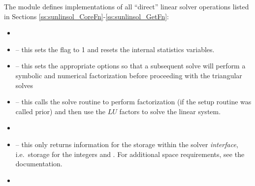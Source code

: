 The {\sunlinsolsludist} module defines implementations of all
``direct'' linear solver operations listed in Sections
\ref{ss:sunlinsol_CoreFn}-\ref{ss:sunlinsol_GetFn}:
\begin{itemize}
\item {}
\item {} -- this sets the
   flag to 1 and resets the internal {\superludist}
  statistics variables.
\item {} -- this sets the appropriate
  {\superludist} options so that a subsequent solve will perform a
  symbolic and numerical factorization before proceeding with the
  triangular solves
\item {} -- this calls the {\superludist}
  solve routine to perform factorization (if the setup routine
  was called prior) and then use the $LU$ factors to solve the
  linear system.
\item {}
\item {} -- this only returns information for
  the storage within the solver \emph{interface}, i.e.~storage for the
  integers  and .  For additional
  space requirements, see the {\superludist} documentation.
\item {}
\end{itemize}

